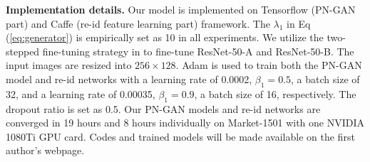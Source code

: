 \documentclass[10pt,letterpaper,twocolumn,10pt,letterpaper,twocolumn]{article}
\begin{document}
\noindent \textbf{Implementation details.} Our model is implemented
on Tensorflow \cite{tensorflow} (PN-GAN part) and Caffe \cite{caffe}
(re-id feature learning part) framework. The $\lambda_{1}$ 
in Eq (\ref{eq:generator}) is empirically set as 10
in all experiments. We utilize the two-stepped fine-tuning strategy
in \cite{geng2016deep} to fine-tune ResNet-50-A and ResNet-50-B.
The input images are resized into $256\times128$. Adam \cite{adam}
is used to train both the PN-GAN model and re-id networks with a learning
rate of 0.0002, $\beta_{1}=0.5$, a batch size of 32, and a learning
rate of 0.00035, $\beta_{1}=0.9$, a batch size of 16, respectively.
The dropout ratio is set as 0.5. Our PN-GAN models and re-id networks
are converged in 19 hours and 8 hours individually on Market-1501
with one NVIDIA 1080Ti GPU card.  Codes and trained models will
be made available on the first author's webpage.
\end{document}
